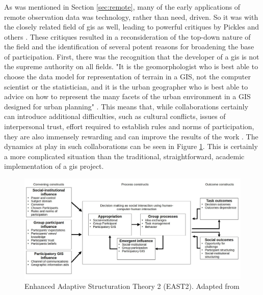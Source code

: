 \subsubsection{} \label{sec:collaborative}

As was mentioned in Section \ref{sec:remote}, many of the early applications of remote observation data was technology, rather than need, driven. So it was with the closely related field of \ac{gis} as well, leading to powerful critiques by Pickles and others \cite{picklesGroundTruthSocial1994}. These critiques resulted in a reconsideration of the top-down nature of the field and the identification of several potent reasons for broadening the base of participation. First, there was the recognition that the developer of a \ac{gis} is not the supreme authority on all fields. "It is the geomorphologist who is best able to choose the data model for representation of terrain in a GIS, not the computer scientist or the statistician, and it is the urban geographer who is best able to advice on how to represent the many facets of the urban environment in a GIS designed for urban planning" \cite{goodchildGeographicInformationSystems1994}. This means that, while collaborations certainly can introduce additional difficulties, such as cultural conflicts, issues of interpersonal trust, effort required to establish rules and norms of participation, they are also immensely rewarding and can improve the results of the work \cite{tullochInstitutionalGeographicInformation2007}. The dynamics at play in such collaborations can be seen in Figure \ref{fig:east2}. This is certainly a more complicated situation than the traditional, straightforward, academic implementation of a \ac{gis} project.

\begin{figure}[h]
	\centering
	\includegraphics[scale=0.4]{Figures/chap2/east2.jpg}
	\caption[Enhanced Adaptive Structuration Theory 2 (EAST2)]{Enhanced Adaptive Structuration Theory 2 (EAST2). Adapted from \cite{jankowskiGISGroupDecision2001}}
	\label{fig:east2}
\end{figure}

